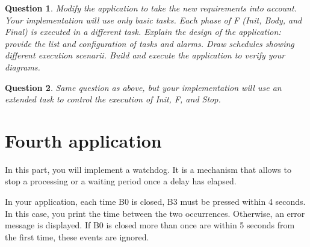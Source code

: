 \documentclass[11pt]{report}
\newtheorem{ex}{Question}
\begin{document}
\begin{center}
\end{center}


\begin{ex}
    Modify the application to take the new requirements into account.
    Your implementation will use only basic tasks.
    Each phase of F (Init, Body, and Final) is executed in a different task.
    Explain the design of the application: provide the list and configuration of tasks and alarms.
    Draw schedules showing different execution scenarii.
    Build and execute the application to verify your diagrams.
\end{ex}

\begin{ex}
    Same question as above, but your implementation will use an extended task to control the execution of Init, F, and Stop.
\end{ex}

\section{Fourth application}

In this part, you will implement a watchdog. It is a mechanism that allows to stop a processing or a waiting period once a delay has elapsed.

In your application, each time B0 is closed, B3 must be pressed within 4 seconds. In this case, you print the time between the two occurrences. Otherwise, an error message is displayed. If B0 is closed more than once are within 5 seconds from the first time, these events are ignored.
\end{document}
